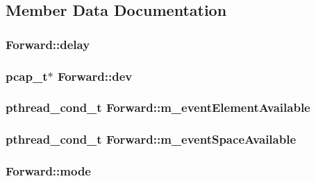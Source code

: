 \subsection{\-Member \-Data \-Documentation}
\hypertarget{structForward_a67d0465a472fe58ca483f0da0b76f709}{
\subsubsection[{delay}]{ {\bf \-Forward\-::delay}}}\label{structForward_a67d0465a472fe58ca483f0da0b76f709}
\hypertarget{structForward_a43e491c45dd179910e10c5f2bf9d4f01}{
\subsubsection[{dev}]{\setlength{\rightskip}{0pt plus 5cm}pcap\-\_\-t$\ast$ {\bf \-Forward\-::dev}}}\label{structForward_a43e491c45dd179910e10c5f2bf9d4f01}
\hypertarget{structForward_ab6d55b3935b255bde55089bfe53fc101}{
\subsubsection[{m\-\_\-event\-Element\-Available}]{\setlength{\rightskip}{0pt plus 5cm}pthread\-\_\-cond\-\_\-t {\bf \-Forward\-::m\-\_\-event\-Element\-Available}}}\label{structForward_ab6d55b3935b255bde55089bfe53fc101}
\hypertarget{structForward_a1cb73933205227fcc53684e1d9be708e}{
\subsubsection[{m\-\_\-event\-Space\-Available}]{\setlength{\rightskip}{0pt plus 5cm}pthread\-\_\-cond\-\_\-t {\bf \-Forward\-::m\-\_\-event\-Space\-Available}}}\label{structForward_a1cb73933205227fcc53684e1d9be708e}
\hypertarget{structForward_a59a8b69d061964b2e52646f7a0083214}{
\subsubsection[{mode}]{ {\bf \-Forward\-::mode}}}\label{structForward_a59a8b69d061964b2e52646f7a0083214}
